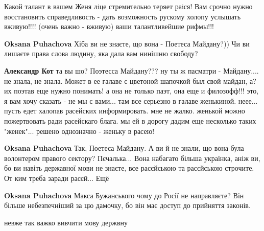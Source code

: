 \begin{itemize}
Какой талант в вашем Женя лiце стремительно теряет раiся! Вам срочно нужно
восстановить справедливость - дать возможность рускому холопу услышать
вживую!!!! (очень важно - вживую) ваши талантливейшие рифмы!!!

\begin{itemize}

\textbf{Oksana Puhachova} Хіба ви не знаєте, що вона - Поетеса Майдану?)) Чи ви лишаєте права слова людину, яка дала вам нинішню свободу?


\textbf{Александр Кот} та вы шо? Поэтесса Майдану??? ну ты ж пасматри - Майдану.... не знала, не знала. Может в ее галаве с цветоной шапочкой был свой майдан, а? их поэтав еще нужно понимать! а она не только паэт, она еще и филозофф!!! это, я вам хочу сказать - не мы с вами... там все серьезно в галаве женькиной. неее... пусть едет халопав расейских информировать. мне не жалко. женькой можно пожертвовать ради расейскаго блага. мы ей в дорогу дадим еще несколько таких "женек"... решено однозначно - женьку в расею!


\textbf{Oksana Puhachova} Так, Поетеса Майдану. А ви й не знали, що вона була волонтером правого сектору? Пєчалька... Вона набагато більша українка, аніж ви, бо ви навіть державної мови не знаєте, все расєйською та расєйською строчите. От ким треба заради расєй... Ещё


\textbf{Oksana Puhachova} Макса Бужанського чому до Росії не направляєте? Він більше небезпечніший за цю дамочку, бо він має доступ до прийняття законів.
\end{itemize}


невже так важко вивчити мову держвну

\begin{itemize}


\end{itemize}
\end{itemize}
